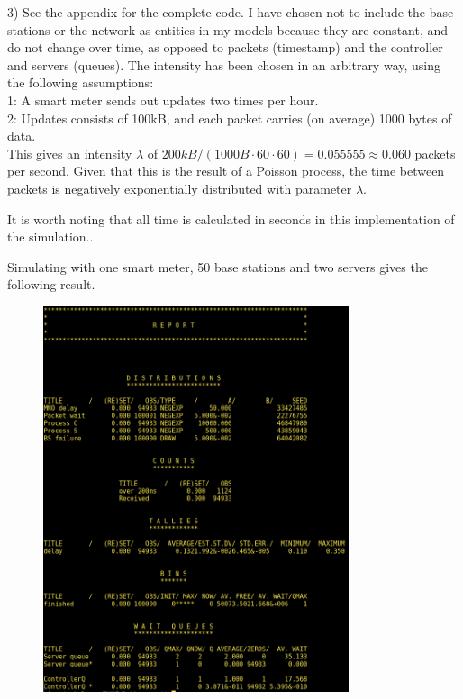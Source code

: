 \documentclass[11pt]{article}
\begin{document}
3)
See the appendix for the complete code. I have chosen not to include the base stations or the network as entities in my models because they are constant, and do not change over time, as opposed to packets (timestamp) and the controller and servers (queues). The intensity has been chosen in an arbitrary way, using the following assumptions:\\
1: A smart meter sends out updates two times per hour.\\
2: Updates consists of 100kB, and each packet carries (on average) 1000 bytes of data.\\
This gives an intensity $\lambda$ of $200kB / (1000B \cdot 60 \cdot 60) = 0.055555 \approx 0.060$ packets per second.
Given that this is the result of a Poisson process, the time between packets is negatively exponentially distributed with parameter $\lambda$.

It is worth noting that all time is calculated in seconds in this implementation of the simulation..

Simulating with one smart meter, 50 base stations and two servers gives the following result.

\begin{figure}
	\includegraphics[width=0.8\textwidth]{demos_1.png}
\end{figure}
\end{document}
